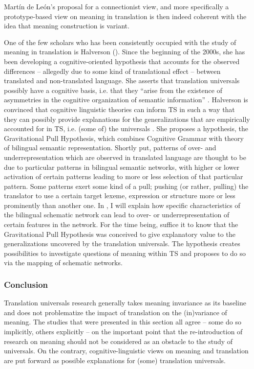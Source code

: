 Martín de León's proposal for a connectionist view, and more specifically a prototype-based view on meaning in translation is then indeed coherent with the idea that meaning construction is variant.

One of the few scholars who has been consistently occupied with the study of meaning in translation is Halverson (\citeyear{halverson_cognitive_2003, shreve_cognitive_2010, de_sutter_developing_2017, rojo_implications_2013}). Since the beginning of the 2000s, she has been developing a cognitive-oriented hypothesis that accounts for the observed differences – allegedly due to some kind of translational effect –  between translated and non-translated language. She asserts that translation universals possibly have a cognitive basis, i.e. that they “arise from the existence of asymmetries in the cognitive organization of semantic information” \citep[197]{halverson_cognitive_2003}. Halverson is convinced that cognitive linguistic theories can inform TS in such a way that they can possibly provide explanations for the generalizations that are empirically accounted for in TS, i.e. (some of) the universals \citep[230]{halverson_cognitive_2003}. She proposes a hypothesis, the Gravitational Pull Hypothesis, which combines  Cognitive Grammar with   theory of bilingual semantic representation. Shortly put, patterns of over- and underrepresentation which are observed in translated language are thought to be due to particular patterns in bilingual semantic networks, with higher or lower activation of certain patterns leading to more or less selection of that particular pattern. Some patterns exert some kind of a pull; pushing (or rather, pulling) the translator to use a certain target lexeme, expression or structure more or less prominently than another one. In , I will explain how specific characteristics of the bilingual schematic network can lead to over- or underrepresentation of certain features in the network. For the time being, suffice it to know that the Gravitational Pull Hypothesis was conceived to give explanatory value to the generalizations uncovered by the translation universals. The hypothesis creates possibilities to investigate questions of meaning within TS and proposes to do so via the mapping of schematic networks. 

\subsubsection{Conclusion}
\label{sec:2.2.3.3}  
Translation universals research generally takes meaning invariance as its baseline and does not problematize the impact of translation on the (in)variance of meaning. The studies that were presented in this section all agree – some do so implicitly, others explicitly – on the important point that the re-introduction of research on meaning should not be considered as an obstacle to the study of universals. On the contrary, cognitive-linguistic views on meaning and translation are put forward as possible explanations for (some) translation universals. 

